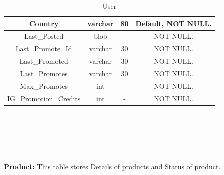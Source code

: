 \begin{table}[hp]
\begin{tabular}{|c|c|c|c|}
\hline
Country & varchar & 80 & Default, NOT NULL. \\
\hline
Last\_Posted & blob &	- & NOT NULL. \\
\hline
Last\_Promote\_Id & varchar & 30 & NOT NULL. \\
\hline
Last\_Promoted & varchar & 30 & NOT NULL. \\
\hline
Last\_Promotes & varchar & 30 & NOT NULL. \\
\hline
Max\_Promotes & int & - & NOT NULL. \\
\hline
IG\_Promotion\_Credits & int & - & NOT NULL. \\
\hline
\end{tabular}
\caption{ User}
\end{table}
\\
\\
\\
\\
\\
\textbf{Product:} This table stores Details of products and Status of product.\nolinebreak
